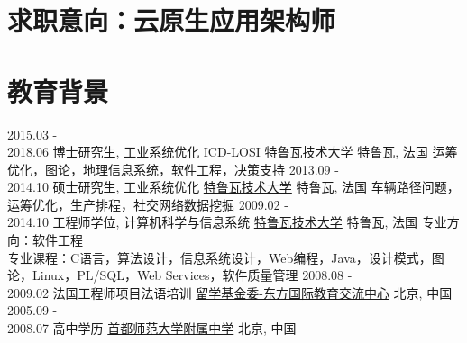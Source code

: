 \documentclass[letterpaper]{twentysecondcv} %
\begin{document}
\makeprofile %

\vspace{-0.2cm}
\section{求职意向：云原生应用架构师}

\vspace{-0.2cm}
\section{教育背景}

\begin{twenty}
	\twentyitem
    	{2015.03 - \\ 2018.06}
        {博士研究生, 工业系统优化}
        {\href{http://losi.utt.fr/en/index.html}{ICD-LOSI 特鲁瓦技术大学}}
        {特鲁瓦, 法国}
        {\textbullet{} 运筹优化，图论，地理信息系统，软件工程，决策支持}
	\twentyitem
    	{2013.09 - \\ 2014.10}
        {硕士研究生, 工业系统优化}
        {\href{http://www.utt.fr/en/index.html}{特鲁瓦技术大学}}
        {特鲁瓦, 法国}
        {\textbullet{} 车辆路径问题，运筹优化，生产排程，社交网络数据挖掘}
        {\vspace{-0.3cm}}
    \twentyitem
    	{2009.02 - \\ 2014.10}
        {工程师学位, 计算机科学与信息系统}
        {\href{http://www.utt.fr/en/index.html}{特鲁瓦技术大学}}
        {特鲁瓦, 法国}
        {\textbullet{} 专业方向：软件工程 \\
        \textbullet{} 专业课程：C语言，算法设计，信息系统设计，Web编程，Java，设计模式，图论，Linux，PL/SQL，Web Services，软件质量管理\vspace{0.3cm}}
    \twentyitem
        {2008.08 - \\ 2009.02}
        {法国工程师项目法语培训}
        {\href{http://www.cscdf.org/}{留学基金委-东方国际教育交流中心}}
        {北京, 中国}
        {\vspace{-0.3cm}}
    \twentyitem
        {2005.09 - \\ 2008.07}
        {高中学历}
        {\href{https://baike.baidu.com/item/首都师范大学附属中学}{首都师范大学附属中学}}
        {北京, 中国}
        {\vspace{-0.6cm}}
\end{twenty}
\end{document}
